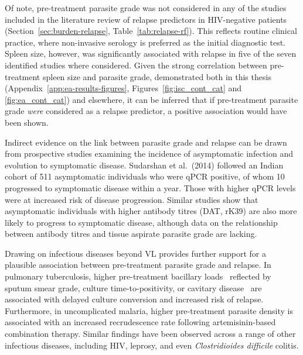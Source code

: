 Of note, pre-treatment parasite grade was not considered in any of the studies included in the literature review of relapse predictors in HIV-negative patients (Section~\ref{sec:burden-relapse}, Table~\ref{tab:relapse-rf}). This reflects routine clinical practice, where non-invasive serology is preferred as the initial diagnostic test. Spleen size, however, was significantly associated with relapse in five of the seven identified studies where considered\cite{sundar2019,burza2014,lucero2015,gorski2010,kajaia2011}. Given the strong correlation between pre-treatment spleen size and parasite grade, demonstrated both in this thesis (Appendix~\ref{app:ea-results-figures}, Figures~\ref{fig:isc_cont_cat} and \ref{fig:ea_cont_cat}) and elsewhere\cite{kumar2018, marwaha1991}, it can be inferred that if pre-treatment parasite grade \textit{were} considered as a relapse predictor, a positive association would have been shown.

Indirect evidence on the link between parasite grade and relapse can be drawn from prospective studies examining the incidence of asymptomatic infection and evolution to symptomatic disease. Sudarshan et al.\ (2014) followed an Indian cohort of 511 asymptomatic individuals who were qPCR positive, of whom 10 progressed to symptomatic disease within a year. Those with higher qPCR levels were at increased risk of disease progression\cite{sudarshan2014}. Similar studies show that asymptomatic individuals with higher antibody titres (DAT, rK39) are also more likely to progress to symptomatic disease\cite{hasker2014,chapman2015}, although data on the relationship between antibody titres and tissue aspirate parasite grade are lacking.

Drawing on infectious diseases beyond VL provides further support for a plausible association between pre-treatment parasite grade and relapse. In pulmonary tuberculosis, higher pre-treatment bacillary loads \textemdash\ reflected by sputum smear grade, culture time-to-positivity, or cavitary disease \textemdash\ are associated with delayed culture conversion and increased risk of relapse\cite{bark2012,hesseling2010}. Furthermore, in uncomplicated malaria, higher pre-treatment parasite density is associated with an increased recrudescence rate following artemisinin-based combination therapy\cite{white2009,WWARN2015}. Similar findings have been observed across a range of other infectious diseases, including HIV\cite{ICONA2019}, leprosy\cite{balagon2009}, and even \textit{Clostridioides difficile} colitis\cite{alonso2022}.

